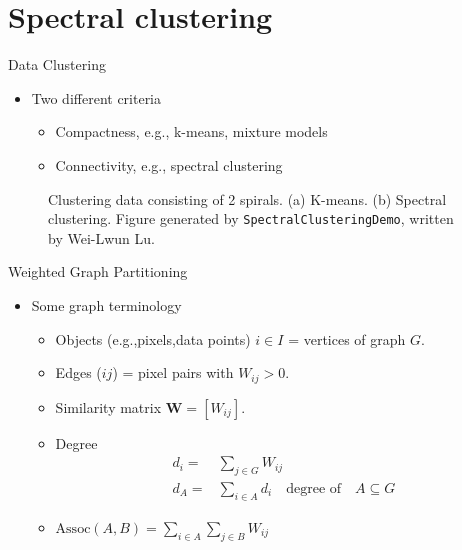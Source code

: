 \documentclass[10pt,mathserif]{beamer}
\begin{document}
\section{Spectral clustering}
\begin{frame}{Data Clustering}
\begin{itemize}
    \item Two different criteria
    \begin{itemize}
        \item Compactness, e.g., k-means, mixture models
        \item Connectivity, e.g., spectral clustering
    \end{itemize}
\end{itemize}  

\begin{figure}[h]
\centering
{}
\caption{Clustering data consisting of 2 spirals. (a) K-means. (b) Spectral clustering. Figure generated by \texttt{SpectralClusteringDemo}, written by Wei-Lwun Lu.}
\end{figure}
\end{frame}

\begin{frame}{Weighted Graph Partitioning}
\begin{itemize}
    \item Some graph terminology
    \begin{itemize}
        \item Objects  (e.g.,pixels,data points) $ i \in I$ = vertices of graph $G$.
        \item Edges ($ij$) = pixel pairs with $W_{ij} > 0$.
        \item Similarity matrix $\bm{W} = [ W_{ij} ]$.
        \item Degree
        \begin{equation*}
            \begin{split}
                d_i = &  \sum_{j \in G} W_{ij}\\
                d_A = & \sum_{i \in A} d_i \quad \text{degree of} \quad A \subseteq G
            \end{split}
        \end{equation*}
        \item $\text{Assoc}(A, B) = \sum_{i \in A}\sum_{j \in B}W_{ij}$
    \end{itemize}
\end{itemize}  
\end{frame}
\end{document}
